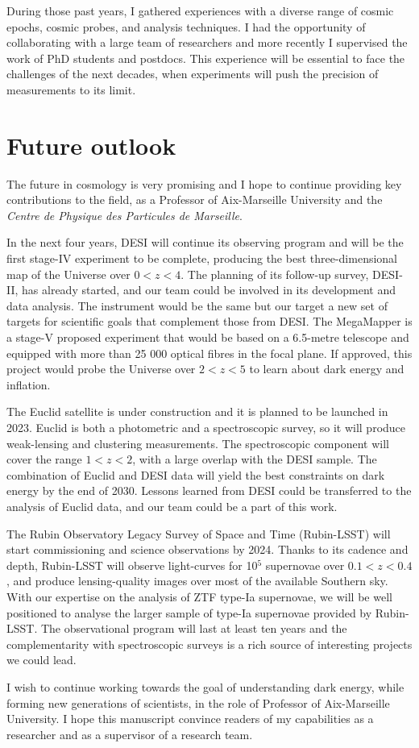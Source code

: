 During those past years, I gathered experiences with a diverse range of cosmic epochs, 
cosmic probes, and analysis techniques. I had the opportunity of collaborating with 
a large team of researchers and more recently I supervised the work of PhD students and postdocs. 
This experience will be essential to face the challenges of the next decades, 
when experiments will push the precision of measurements to its limit. 

\section*{Future outlook}

The future in cosmology is very promising and I hope to continue providing key contributions to 
the field, as a Professor of Aix-Marseille University and the \emph{Centre de Physique des Particules de Marseille}. 

In the next four years, DESI will continue its observing program and will be 
the first stage-IV experiment to be complete, producing the best three-dimensional map 
of the Universe over $0 < z < 4$. 
The planning of its follow-up survey, DESI-II, has already started, and our team could be 
involved in its development and data analysis. The instrument would be the same but our target 
a new set of targets for scientific goals that complement those from DESI. 
The MegaMapper is a stage-V proposed experiment that would be based on a 6.5-metre telescope 
and equipped with more than 25 000 optical fibres in the focal plane. If approved, this 
project would probe the Universe over $2 < z < 5$ to learn about dark energy and inflation. 

The Euclid satellite is under construction and it is planned to be launched in 2023. 
Euclid is both a photometric and a spectroscopic survey, so it will produce weak-lensing 
and clustering measurements. The spectroscopic component will cover the range $1< z < 2$, 
with a large overlap with the DESI sample. The combination of Euclid and DESI data will 
yield the best constraints on dark energy by the end of 2030.
Lessons learned from DESI could be transferred to the analysis of Euclid data, 
and our team could be a part of this work. 

The Rubin Observatory Legacy Survey of Space and Time (Rubin-LSST) will start 
commissioning and science observations by 2024. Thanks to its cadence and depth, 
Rubin-LSST will observe light-curves for 10$^5$ supernovae over $0.1< z < 0.4$,
and produce lensing-quality images over most of the available Southern sky. 
With our expertise on the analysis of ZTF type-Ia supernovae, 
we will be well positioned to analyse the larger sample of type-Ia supernovae 
provided by Rubin-LSST. The observational program will last at least ten years
and the complementarity with spectroscopic surveys is a rich source of 
interesting projects we could lead. 


I wish to continue working towards the goal of understanding dark energy,
while forming new generations of scientists, in the role of Professor of 
Aix-Marseille University. 
I hope this manuscript convince readers of my capabilities as a researcher
and as a supervisor of a research team. 
